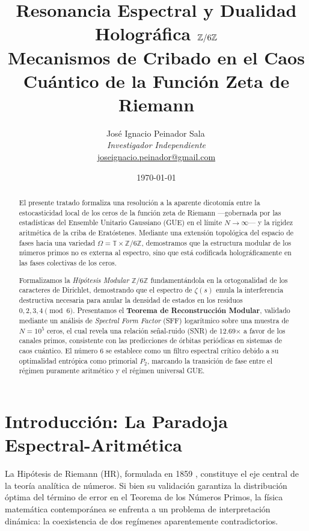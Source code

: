 \documentclass[12pt, a4paper]{article}
\title{\textbf{Resonancia Espectral y Dualidad Holográfica $\Z/6\Z$}\\
\large{Mecanismos de Cribado en el Caos Cuántico de la Función Zeta de Riemann}}
\author{
  José Ignacio Peinador Sala\,\orcidlink{0009-0008-1822-3452} \\
  \textit{Investigador Independiente} \\
  \href{joseignacio.peinador@gmail.com}{joseignacio.peinador@gmail.com}
}
\date{\today}
\theoremstyle{plain}
\theoremstyle{definition}
\newcommand{\Z}{\mathbb{Z}}
\newcommand{\T}{\mathbb{T}}
\begin{document}
\maketitle

\begin{abstract}
El presente tratado formaliza una resolución a la aparente dicotomía entre la estocasticidad local de los ceros de la función zeta de Riemann —gobernada por las estadísticas del Ensemble Unitario Gaussiano (GUE) en el límite $N \to \infty$— y la rigidez aritmética de la criba de Eratóstenes. Mediante una extensión topológica del espacio de fases hacia una variedad $\Omega = \T \times \Z/6\Z$, demostramos que la estructura modular de los números primos no es externa al espectro, sino que está codificada holográficamente en las fases colectivas de los ceros.

Formalizamos la \emph{Hipótesis Modular $\Z/6\Z$} fundamentándola en la ortogonalidad de los caracteres de Dirichlet, demostrando que el espectro de $\zeta(s)$ emula la interferencia destructiva necesaria para anular la densidad de estados en los residuos $0,2,3,4 \pmod{6}$. Presentamos el \textbf{Teorema de Reconstrucción Modular}, validado mediante un análisis de \emph{Spectral Form Factor} (SFF) logarítmico sobre una muestra de $N=10^5$ ceros, el cual revela una relación señal-ruido (SNR) de 12.69$\times$ a favor de los canales primos, consistente con las predicciones de órbitas periódicas en sistemas de caos cuántico. El número 6 se establece como un filtro espectral crítico debido a su optimalidad entrópica como primorial $P_2$, marcando la transición de fase entre el régimen puramente aritmético y el régimen universal GUE.
\end{abstract}

\section{Introducción: La Paradoja Espectral-Aritmética}

La Hipótesis de Riemann (HR), formulada en 1859 \cite{riemann1859}, constituye el eje central de la teoría analítica de números. Si bien su validación garantiza la distribución óptima del término de error en el Teorema de los Números Primos, la física matemática contemporánea se enfrenta a un problema de interpretación dinámica: la coexistencia de dos regímenes aparentemente contradictorios.
\end{document}
